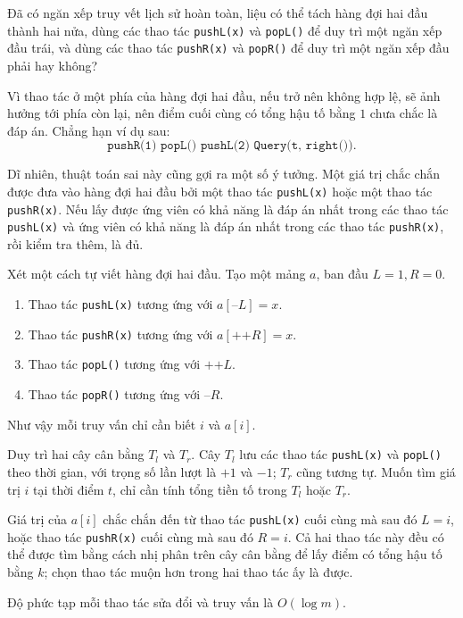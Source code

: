 \documentclass[11pt]{article}
\begin{document}
Đã có ngăn xếp truy vết lịch sử hoàn toàn, liệu có thể tách hàng đợi hai đầu
thành hai nửa, dùng các thao tác \texttt{pushL(x)} và \texttt{popL()} để duy
trì một ngăn xếp đầu trái, và dùng các thao tác \texttt{pushR(x)} và
\texttt{popR()} để duy trì một ngăn xếp đầu phải hay không?

Vì thao tác ở một phía của hàng đợi hai đầu, nếu trở nên không hợp lệ, sẽ ảnh
hưởng tới phía còn lại, nên điểm cuối cùng có tổng hậu tố bằng \(1\) chưa
chắc là đáp án. Chẳng hạn ví dụ sau:
\[
\texttt{pushR(1) popL() pushL(2) Query(t, right())}.
\]

Dĩ nhiên, thuật toán sai này cũng gợi ra một số ý tưởng. Một giá trị chắc
chắn được đưa vào hàng đợi hai đầu bởi một thao tác \texttt{pushL(x)} hoặc
một thao tác \texttt{pushR(x)}. Nếu lấy được ứng viên có khả năng là đáp án
nhất trong các thao tác \texttt{pushL(x)} và ứng viên có khả năng là đáp án
nhất trong các thao tác \texttt{pushR(x)}, rồi kiểm tra thêm, là đủ.

Xét một cách tự viết hàng đợi hai đầu. Tạo một mảng \(a\), ban đầu
\(L=1, R=0\).

\begin{enumerate}
  \item Thao tác \texttt{pushL(x)} tương ứng với \(a[\texttt{--}L]=x\).
  \item Thao tác \texttt{pushR(x)} tương ứng với \(a[\texttt{++}R]=x\).
  \item Thao tác \texttt{popL()} tương ứng với \(\texttt{++}L\).
  \item Thao tác \texttt{popR()} tương ứng với \(\texttt{--}R\).
\end{enumerate}

Như vậy mỗi truy vấn chỉ cần biết \(i\) và \(a[i]\).

Duy trì hai cây cân bằng \(T_l\) và \(T_r\). Cây \(T_l\) lưu các thao tác
\texttt{pushL(x)} và \texttt{popL()} theo thời gian, với trọng số lần lượt là
\(+1\) và \(-1\); \(T_r\) cũng tương tự. Muốn tìm giá trị \(i\) tại thời điểm
\(t\), chỉ cần tính tổng tiền tố trong \(T_l\) hoặc \(T_r\).

Giá trị của \(a[i]\) chắc chắn đến từ thao tác \texttt{pushL(x)} cuối cùng mà
sau đó \(L=i\), hoặc thao tác \texttt{pushR(x)} cuối cùng mà sau đó \(R=i\).
Cả hai thao tác này đều có thể được tìm bằng cách nhị phân trên cây cân bằng
để lấy điểm có tổng hậu tố bằng \(k\); chọn thao tác muộn hơn trong hai thao
tác ấy là được.

Độ phức tạp mỗi thao tác sửa đổi và truy vấn là \(O(\log m)\).
\end{document}
